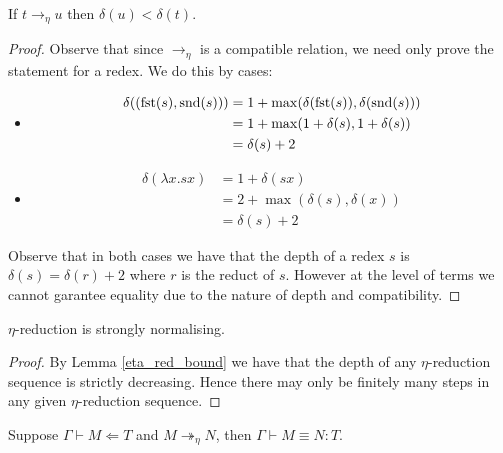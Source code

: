 \begin{lemma}\label{eta_red_bound}
    If $t \to_{\eta} u$ then $\delta(u) < \delta(t)$.
\end{lemma}

\begin{proof}
    Observe that since $\to_{\eta}$ is a compatible relation, we need only prove the statement for a redex. We do this by cases:
    \begin{itemize}
        \item
        $$
            \begin{aligned}
                \delta ((\mathrm{fst}(s), \mathrm{snd}(s))) &= 1+ \max(\delta(\mathrm{fst}(s)), \delta(\mathrm{snd}(s))) \\
                &= 1 + \max(1+ \delta(s), 1+ \delta(s)) \\
                &= \delta(s)+ 2
            \end{aligned}
        $$
        \item
        $$
            \begin{aligned}
                \delta (\lambda x . s x) &= 1 + \delta(s x) \\
                &= 2 + \max(\delta(s), \delta(x)) \\
                &= \delta(s) + 2
            \end{aligned}
        $$
    \end{itemize}
    Observe that in both cases we have that the depth of a redex $s$ is $\delta(s) = \delta(r) + 2$ where $r$ is the reduct of $s$. However at the level of terms we cannot garantee equality due to the nature of depth and compatibility. 
\end{proof}

\begin{lemma}\label{eta_SN}
    $\eta$-reduction is strongly normalising.
\end{lemma}

\begin{proof}
    By Lemma \ref{eta_red_bound} we have that the depth of any $\eta$-reduction sequence is strictly decreasing. Hence there may only be finitely many steps in any given $\eta$-reduction sequence.
\end{proof}

\begin{lemma}\label{eta_coh}
    Suppose $\Gamma \vdash M \Leftarrow T$ and $M \twoheadrightarrow_{\eta} N$, then $\Gamma \vdash M \equiv N : T$.
\end{lemma}

